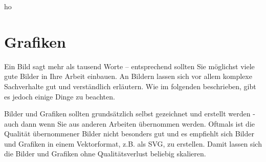 ho%
\section{Grafiken}\label{sec:graphics}
%
\glqq Ein Bild sagt mehr als tausend Worte\grqq{} -- entsprechend sollten Sie möglichst viele gute Bilder in Ihre Arbeit einbauen. An Bildern lassen sich vor allem komplexe Sachverhalte gut und verständlich erläutern. Wie im folgenden beschrieben, gibt es jedoch einige Dinge zu beachten.

Bilder und Grafiken sollten grundsätzlich selbst gezeichnet und erstellt werden - auch dann wenn Sie aus anderen Arbeiten übernommen werden. Oftmals ist die Qualität übernommener Bilder nicht besonders gut und es empfiehlt sich Bilder und Grafiken in einem Vektorformat, z.B. als SVG, zu erstellen. Damit lassen sich die Bilder und Grafiken ohne Qualitätsverlust beliebig skalieren.
